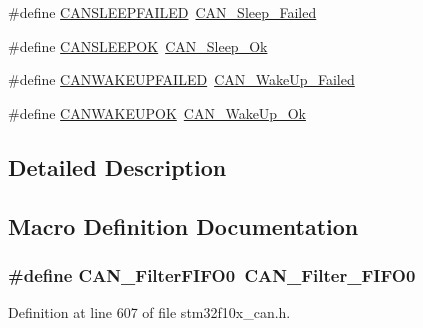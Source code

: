\begin{DoxyCompactItemize}
\item 
\#define \hyperlink{group___c_a_n___legacy_ga4d5e8e0c57febb024b30e5f24866a117}{C\+A\+N\+S\+L\+E\+E\+P\+F\+A\+I\+L\+ED}~\hyperlink{group___c_a_n__sleep__constants_ga169500ab7169c4e9c7e9e4ea34b3e070}{C\+A\+N\+\_\+\+Sleep\+\_\+\+Failed}
\item 
\#define \hyperlink{group___c_a_n___legacy_ga2f8d34f8f60a6c84d8e436d4d37708ab}{C\+A\+N\+S\+L\+E\+E\+P\+OK}~\hyperlink{group___c_a_n__sleep__constants_gaf5c4e9d32d4faff9d0bf61e153ed7998}{C\+A\+N\+\_\+\+Sleep\+\_\+\+Ok}
\item 
\#define \hyperlink{group___c_a_n___legacy_ga0de3b0e2c544d9fa772b646e331e51b1}{C\+A\+N\+W\+A\+K\+E\+U\+P\+F\+A\+I\+L\+ED}~\hyperlink{group___c_a_n__wake__up__constants_ga837fd7ad47fee78e43a186544e2b390b}{C\+A\+N\+\_\+\+Wake\+Up\+\_\+\+Failed}
\item 
\#define \hyperlink{group___c_a_n___legacy_gafed6ab4dbb00c9d63f6a7cdf323f33ef}{C\+A\+N\+W\+A\+K\+E\+U\+P\+OK}~\hyperlink{group___c_a_n__wake__up__constants_ga152e4935cf85bdfb803eb36b656cd690}{C\+A\+N\+\_\+\+Wake\+Up\+\_\+\+Ok}
\end{DoxyCompactItemize}


\subsection{Detailed Description}


\subsection{Macro Definition Documentation}
\subsubsection[{\texorpdfstring{C\+A\+N\+\_\+\+Filter\+F\+I\+F\+O0}{CAN_FilterFIFO0}}]{\setlength{\rightskip}{0pt plus 5cm}\#define C\+A\+N\+\_\+\+Filter\+F\+I\+F\+O0~{\bf C\+A\+N\+\_\+\+Filter\+\_\+\+F\+I\+F\+O0}}\hypertarget{group___c_a_n___legacy_ga1b3d041dff9fed4dad75ed2a4a0e27e0}{}\label{group___c_a_n___legacy_ga1b3d041dff9fed4dad75ed2a4a0e27e0}


Definition at line 607 of file stm32f10x\+\_\+can.\+h.

